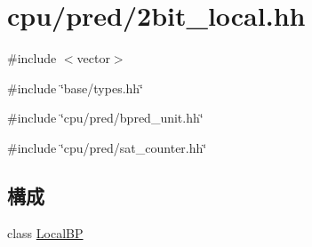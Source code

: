 \hypertarget{2bit__local_8hh}{
\section{cpu/pred/2bit\_\-local.hh}
\label{2bit__local_8hh}
}
{\ttfamily \#include $<$vector$>$}\par
{\ttfamily \#include \char`\"{}base/types.hh\char`\"{}}\par
{\ttfamily \#include \char`\"{}cpu/pred/bpred\_\-unit.hh\char`\"{}}\par
{\ttfamily \#include \char`\"{}cpu/pred/sat\_\-counter.hh\char`\"{}}\par
\subsection*{構成}
\begin{DoxyCompactItemize}
\item 
class \hyperlink{classLocalBP}{LocalBP}
\end{DoxyCompactItemize}
